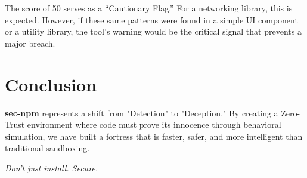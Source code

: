 \documentclass[12pt,a4paper]{article}
\begin{document}
The score of 50 serves as a ``Cautionary Flag.'' For a networking library, this is expected. However, if these same patterns were found in a simple UI component or a utility library, the tool's warning would be the critical signal that prevents a major breach.

\section{Conclusion}
\textbf{sec-npm} represents a shift from "Detection" to "Deception." By creating a Zero-Trust environment where code must prove its innocence through behavioral simulation, we have built a fortress that is faster, safer, and more intelligent than traditional sandboxing.

\textit{Don't just install. Secure.}
\end{document}
